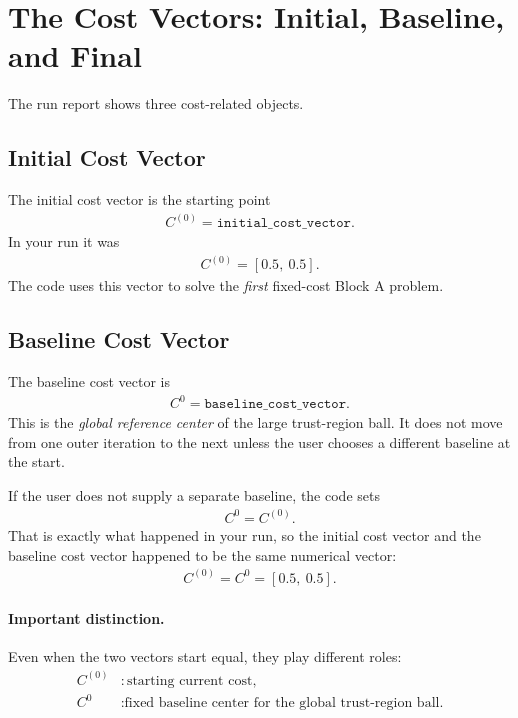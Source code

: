 \documentclass[11pt]{article}
\begin{document}
\section{The Cost Vectors: Initial, Baseline, and Final}
The run report shows three cost-related objects.

\subsection{Initial Cost Vector}
The initial cost vector is the starting point
\begin{align}
C^{(0)} = \texttt{initial\_cost\_vector}.
\end{align}
In your run it was
\begin{align}
C^{(0)} = [0.5,\ 0.5].
\end{align}
The code uses this vector to solve the \emph{first} fixed-cost Block A problem.

\subsection{Baseline Cost Vector}
The baseline cost vector is
\begin{align}
C^0 = \texttt{baseline\_cost\_vector}.
\end{align}
This is the \emph{global reference center} of the large trust-region ball. It
does not move from one outer iteration to the next unless the user chooses a
different baseline at the start.

If the user does not supply a separate baseline, the code sets
\begin{align}
C^0 = C^{(0)}.
\end{align}
That is exactly what happened in your run, so the initial cost vector and the
baseline cost vector happened to be the same numerical vector:
\begin{align}
C^{(0)} = C^0 = [0.5,\ 0.5].
\end{align}

\paragraph{Important distinction.}
Even when the two vectors start equal, they play different roles:
\begin{align*}
C^{(0)} &: \text{starting current cost}, \\
C^0 &: \text{fixed baseline center for the global trust-region ball.}
\end{align*}
\end{document}
